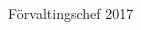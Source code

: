 \documentclass[../_main/handlingar.tex]{subfiles}
\begin{document}


\begin{signatures}{1}
    \mvh
    \signature{Sophia Grimmei\ss\ Grahm}{Förvaltingschef 2017}
\end{signatures}
\end{document}
